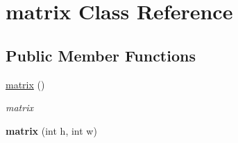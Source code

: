 \hypertarget{classmatrix}{\section{matrix \-Class \-Reference}
\label{classmatrix}
}
\subsection*{\-Public \-Member \-Functions}
\begin{DoxyCompactItemize}
\item 
\hypertarget{classmatrix_a4daf70b1506ea976352f20e4322a9c17}{\hyperlink{classmatrix_a4daf70b1506ea976352f20e4322a9c17}{matrix} ()}\label{classmatrix_a4daf70b1506ea976352f20e4322a9c17}

\begin{DoxyCompactList}\small\item\em matrix \end{DoxyCompactList}\item 
\hypertarget{classmatrix_a674b832d41c7a541b83659f10a90c9bc}{{\bfseries matrix} (int h, int w)}\label{classmatrix_a674b832d41c7a541b83659f10a90c9bc}


\end{DoxyCompactItemize}
